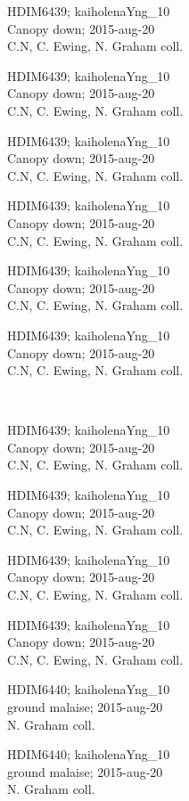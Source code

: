 \documentclass[2pt]{extarticle}
\begin{document}
\noindent
\parbox{0.16\textwidth}{\tiny \raggedright \rule[-0.3\baselineskip]{0pt}{10pt}HDIM6439; kaiholenaYng\_10\\ Canopy down; 2015-aug-20\\ C.N, C. Ewing, N. Graham coll.}
\parbox{0.16\textwidth}{\tiny \raggedright \rule[-0.3\baselineskip]{0pt}{10pt}HDIM6439; kaiholenaYng\_10\\ Canopy down; 2015-aug-20\\ C.N, C. Ewing, N. Graham coll.}
\parbox{0.16\textwidth}{\tiny \raggedright \rule[-0.3\baselineskip]{0pt}{10pt}HDIM6439; kaiholenaYng\_10\\ Canopy down; 2015-aug-20\\ C.N, C. Ewing, N. Graham coll.}
\parbox{0.16\textwidth}{\tiny \raggedright \rule[-0.3\baselineskip]{0pt}{10pt}HDIM6439; kaiholenaYng\_10\\ Canopy down; 2015-aug-20\\ C.N, C. Ewing, N. Graham coll.}
\parbox{0.16\textwidth}{\tiny \raggedright \rule[-0.3\baselineskip]{0pt}{10pt}HDIM6439; kaiholenaYng\_10\\ Canopy down; 2015-aug-20\\ C.N, C. Ewing, N. Graham coll.}
\parbox{0.16\textwidth}{\tiny \raggedright \rule[-0.3\baselineskip]{0pt}{10pt}HDIM6439; kaiholenaYng\_10\\ Canopy down; 2015-aug-20\\ C.N, C. Ewing, N. Graham coll.} \\ 
\vspace{0.001in} 

\noindent
\parbox{0.16\textwidth}{\tiny \raggedright \rule[-0.3\baselineskip]{0pt}{10pt}HDIM6439; kaiholenaYng\_10\\ Canopy down; 2015-aug-20\\ C.N, C. Ewing, N. Graham coll.}
\parbox{0.16\textwidth}{\tiny \raggedright \rule[-0.3\baselineskip]{0pt}{10pt}HDIM6439; kaiholenaYng\_10\\ Canopy down; 2015-aug-20\\ C.N, C. Ewing, N. Graham coll.}
\parbox{0.16\textwidth}{\tiny \raggedright \rule[-0.3\baselineskip]{0pt}{10pt}HDIM6439; kaiholenaYng\_10\\ Canopy down; 2015-aug-20\\ C.N, C. Ewing, N. Graham coll.}
\parbox{0.16\textwidth}{\tiny \raggedright \rule[-0.3\baselineskip]{0pt}{10pt}HDIM6439; kaiholenaYng\_10\\ Canopy down; 2015-aug-20\\ C.N, C. Ewing, N. Graham coll.}
\parbox{0.16\textwidth}{\tiny \raggedright \rule[-0.3\baselineskip]{0pt}{10pt}HDIM6440; kaiholenaYng\_10\\ ground malaise; 2015-aug-20\\ N. Graham coll.}
\parbox{0.16\textwidth}{\tiny \raggedright \rule[-0.3\baselineskip]{0pt}{10pt}HDIM6440; kaiholenaYng\_10\\ ground malaise; 2015-aug-20\\ N. Graham coll.} \\ 
\vspace{0.001in} 
\end{document}
